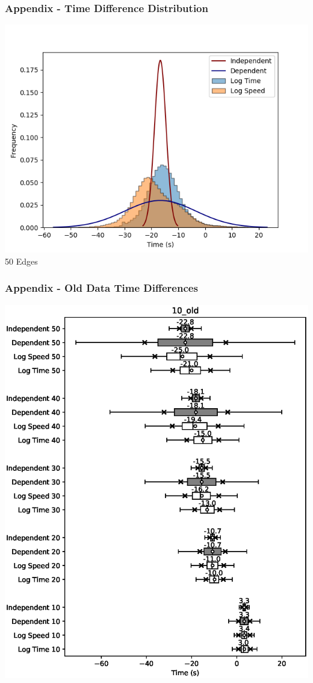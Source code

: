\documentclass{beamer}
\begin{document}
	\begin{frame}
		\frametitle{Appendix -  Time Difference Distribution}
		\includegraphics[width=\textwidth,height=\textheight,keepaspectratio]{DiffDist-10-50.png}
		50 Edges
	\end{frame}
	\begin{frame}
		\frametitle{Appendix - Old Data Time Differences}
		\hspace{1.6cm}\includegraphics[height=0.8\textheight]{10_old.eps}
	\end{frame}
\end{document}
